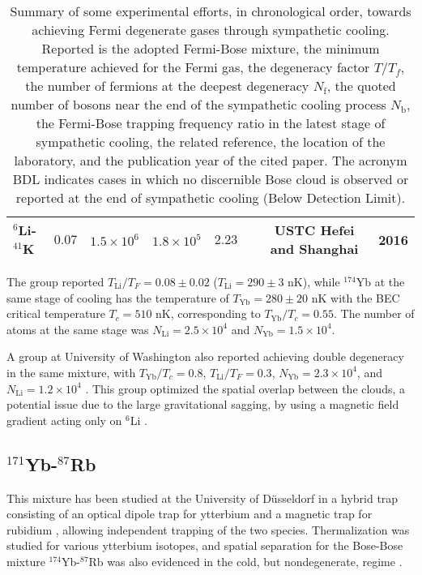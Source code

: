\documentclass[pra,letterpaper,twocolumn,showpacs,superscriptaddress]{revtex4}
\begin{document}
\begin{table*}[t]
\begin{center}
\begin{tabular}{|l|c|c|c|c|c|c|c|}
 ${}^{6}$Li-${}^{41}$K          &  $0.07$                            &  $1.5 \times 10^6$                      & $1.8 \times 10^5$   &      $2.23$            &  \cite{Yao2016}  & USTC Hefei and Shanghai & 2016  \\
\hline
\end{tabular}
\caption{Summary of some experimental efforts, in chronological order, towards achieving Fermi degenerate gases through sympathetic cooling. 
Reported is the adopted Fermi-Bose mixture, the minimum temperature achieved for the Fermi gas, the degeneracy factor $T/T_f$, the number 
of fermions at the deepest degeneracy $N_\mathrm{f}$, the quoted number of bosons near the end of the sympathetic cooling process $N_\mathrm{b}$, the Fermi-Bose 
trapping frequency ratio in the latest stage of sympathetic cooling, the related reference, the location of the laboratory, and the publication year of the cited paper. 
The acronym BDL indicates cases in which no discernible Bose cloud is observed or reported at the end of sympathetic cooling (Below Detection Limit).} 
\end{center}
\label{}
\end{table*}
The group reported $T_{\mathrm{Li}}/T_F=0.08 \pm 0.02$ ($T_{\mathrm{Li}}=290 \pm 3$ nK), while ${}^{174}$Yb at the same stage of cooling 
 has the temperature of $T_{\mathrm{Yb}}=280 \pm  20$ nK with the BEC critical temperature 
$T_c= 510$ nK, corresponding to $T_{\mathrm{Yb}}/T_c=0.55$. The number of atoms at the same stage was  
$N_{\mathrm{Li}}=2.5 \times 10^4$ and $N_{\mathrm{Yb}}=1.5 \times 10^4$. 

A group at University of Washington also reported achieving double degeneracy in the same mixture, with $T_{\mathrm{Yb}}/T_c=0.8$,  
$T_{\mathrm{Li}}/T_F=0.3$, $N_{\mathrm{Yb}}=2.3 \times 10^4$, and $N_{\mathrm{Li}}=1.2 \times 10^4$ \cite{Hansen2011}. 
This group optimized the spatial overlap between the clouds, a potential issue due to the large 
gravitational sagging, by using a magnetic field gradient acting only on ${}^6$Li \cite{Hansen2013}. 

\subsection{${}^{171}$Yb-${}^{87}$Rb}

This mixture has been studied at the University of D\"usseldorf in a hybrid trap consisting 
of an optical dipole trap for ytterbium and a magnetic trap for rubidium \cite{Tassy2010}, 
allowing independent trapping of the two species. Thermalization was studied for various ytterbium 
isotopes, and spatial separation for the Bose-Bose mixture  ${}^{174}$Yb-${}^{87}$Rb was also evidenced 
in the cold, but nondegenerate, regime \cite{Baumer2011}. 
\end{document}
